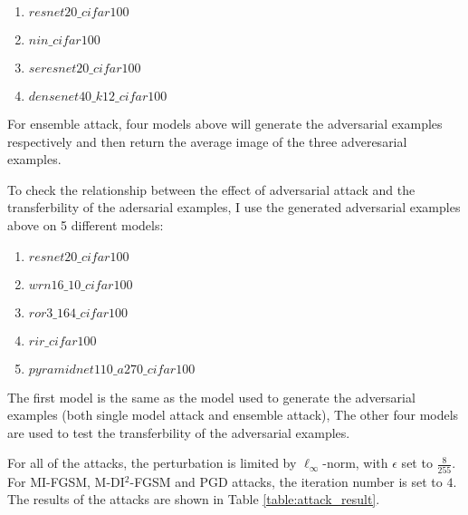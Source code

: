 \documentclass{article}
\newcommand {\DIFGSM} {
  M-DI$^{2}$-FGSM
}
\begin{document}
\begin{enumerate}
  \item $resnet20\_cifar100$
  \item $nin\_cifar100$
  \item $seresnet20\_cifar100$
  \item $densenet40\_k12\_cifar100$
\end{enumerate}

For ensemble attack, four models above will generate the adversarial examples respectively and then return the average image of the three adveresarial examples.

To check the relationship between the effect of adversarial attack and the transferbility of the adersarial examples, 
I use the generated adversarial examples above on 5 different models:

\begin{enumerate}
  \item $resnet20\_cifar100$
  \item $wrn16\_10\_cifar100$
  \item $ror3\_164\_cifar100$
  \item $rir\_cifar100$
  \item $pyramidnet110\_a270\_cifar100$
\end{enumerate}

The first model is the same as the model used to generate the adversarial examples (both single model attack and ensemble attack),
The other four models are used to test the transferbility of the adversarial examples.

For all of the attacks, the perturbation is limited by $\ell_\infty$-norm, with $\epsilon$ set to $\frac{8}{255}$.
For MI-FGSM, \DIFGSM and PGD attacks, the iteration number is set to $4$.
The results of the attacks are shown in Table \ref{table:attack_result}.
\end{document}
